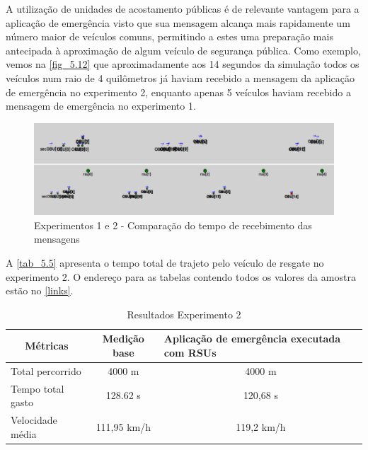 \documentclass[
12pt,				%
openright,			%
oneside,			%
a4paper,			%
brazil,				%
]{abntex2}
\begin{document}
	\par A utilização de unidades de acostamento públicas é de relevante vantagem para a aplicação de emergência visto que sua mensagem alcança mais rapidamente um número maior de veículos comuns, permitindo a estes uma preparação mais antecipada à aproximação de algum veículo de segurança pública. Como exemplo, vemos na \autoref{fig_5.12} que aproximadamente aos 14 segundos da simulação todos os veículos num raio de 4 quilômetros já haviam recebido a mensagem da aplicação de emergência no experimento 2, enquanto apenas 5 veículos haviam recebido a mensagem de emergência no experimento 1.
	
	\begin{figure}[H]
		\centering
		\includegraphics[scale=.4]{figuras/cap5/512Experimento2TkEnv2}
		\caption{\label{fig_5.12}Experimentos 1 e 2 - Comparação do tempo de recebimento das mensagens}
	\end{figure}	
	
	\par A \autoref{tab_5.5} apresenta o tempo total de trajeto pelo veículo de resgate no experimento 2. O endereço para as tabelas contendo todos os valores da amostra estão no \autoref{links}.
	
	\begin{table}[H]
		\centering
		\renewcommand{\arraystretch}{1.5}
		\begin{tabular}{|l|c|p{5.2cm}|}
			\hline
			\multicolumn{1}{|c|}{\textbf{Métricas}} & \textbf{Medição base} & \textbf{Aplicação  de emergência executada com RSUs} \\ \hline
			Total percorrido & 4000 m & \multicolumn{1}{c|}{4000 m} \\ \hline
			Tempo total gasto & 128.62 s & \multicolumn{1}{c|}{120,68 s} \\ \hline
			Velocidade média & 111,95 km/h & \multicolumn{1}{c|}{119,2 km/h} \\ \hline
		\end{tabular}
		\caption{Resultados Experimento 2}
		\label{tab_5.5}
	\end{table}
	
\end{document}
